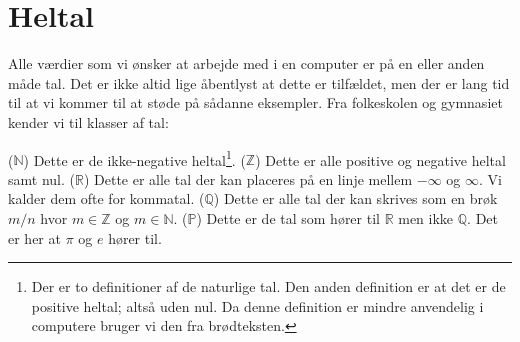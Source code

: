 \chapter{Heltal}
\label{sec:int}

Alle værdier som vi ønsker at arbejde med i en computer er på en eller anden måde tal. Det er ikke altid lige åbentlyst at dette er tilfældet, men der er lang tid til at vi kommer til at støde på sådanne eksempler. Fra folkeskolen og gymnasiet kender vi til klasser af tal:
\begin{itemize}
   ($\mathbb{N}$) Dette er de ikke-negative heltal\footnote{Der er to definitioner af de naturlige tal. Den anden definition er at det er de positive heltal; altså uden nul. Da denne definition er mindre anvendelig i computere bruger vi den fra brødteksten.}.
   ($\mathbb{Z}$) Dette er alle positive og negative heltal samt nul.
   ($\mathbb{R}$) Dette er alle tal der kan placeres på en linje mellem $-\infty$ og $\infty$. Vi kalder dem ofte for kommatal.
   ($\mathbb{Q}$) Dette er alle tal der kan skrives som en brøk $m/n$ hvor $m \in \mathbb{Z}$ og $m \in \mathbb{N}$.
   ($\mathbb{P}$) Dette er de tal som hører til $\mathbb{R}$ men ikke $\mathbb{Q}$. Det er her at $\pi$ og $e$ hører til.
\end{itemize}
 
